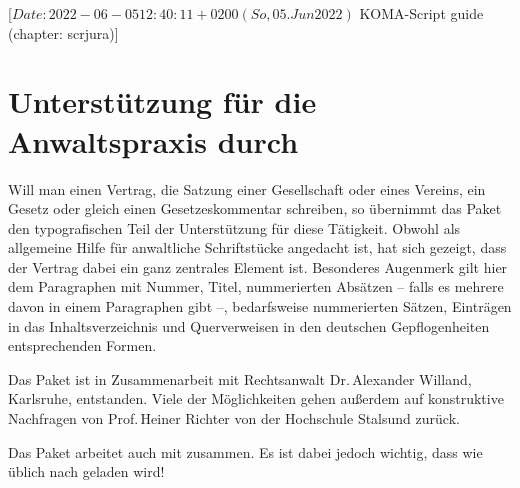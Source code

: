 %
%
%
%
%
%
%

%
                 [$Date: 2022-06-05 12:40:11 +0200 (So, 05. Jun 2022) $
                  KOMA-Script guide (chapter: scrjura)]

\chapter{Unterstützung für die Anwaltspraxis durch }
\BeginIndexGroup
{}

Will man einen Vertrag, die Satzung einer
Gesellschaft oder eines Vereins, ein Gesetz oder gleich einen
Gesetzeskommentar schreiben, so übernimmt das Paket  den
typografischen Teil der Unterstützung für diese Tätigkeit. Obwohl
 als allgemeine Hilfe für anwaltliche Schriftstücke angedacht
ist, hat sich gezeigt, dass der Vertrag dabei ein ganz zentrales Element
ist. Besonderes Augenmerk gilt hier dem
Paragraphen mit Nummer, Titel, nummerierten
Absätzen -- falls es mehrere davon in einem Paragraphen gibt --, bedarfsweise
nummerierten Sätzen, Einträgen in das Inhaltsverzeichnis und Querverweisen in
den deutschen Gepflogenheiten entsprechenden Formen.

Das Paket ist in Zusammenarbeit mit Rechtsanwalt Dr.\,Alexander Willand,
Karlsruhe, entstanden. Viele der Möglichkeiten gehen außerdem auf konstruktive
Nachfragen von Prof.\,Heiner Richter von der Hochschule Stalsund zurück.

\iffalse %
Es ist zu beachten, dass das Paket mit
\Package{hyperref}\IndexPackage{hyperref}\important{\Package{hyperref}}
zusammenarbeitet. %
\else%
Das Paket arbeitet auch mit
zusammen. %
\fi%
Es ist dabei jedoch wichtig, dass  wie üblich nach
 geladen wird!

